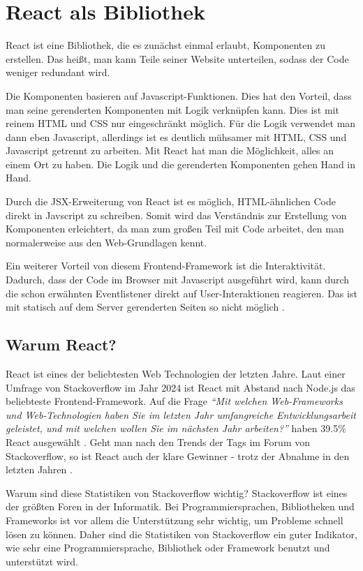 \section{React als Bibliothek}
React ist eine Bibliothek, die es zunächst einmal erlaubt, Komponenten zu erstellen. Das heißt, man kann Teile seiner Website unterteilen, sodass der Code weniger redundant wird. 

Die Komponenten basieren auf Javascript-Funktionen. Dies hat den Vorteil, dass man seine gerenderten Komponenten mit Logik verknüpfen kann. Dies ist mit reinem HTML und CSS nur eingeschränkt möglich. Für die Logik verwendet man dann eben Javascript, allerdings ist es deutlich mühsamer mit HTML, CSS und Javascript getrennt zu arbeiten. Mit React hat man die Möglichkeit, alles an einem Ort zu haben. Die Logik und die gerenderten Komponenten gehen Hand in Hand.

Durch die JSX-Erweiterung von React ist es möglich, HTML-ähnlichen Code direkt in Javscript zu schreiben. Somit wird das Verständnis zur Erstellung von Komponenten erleichtert, da man zum großen Teil mit Code arbeitet, den man normalerweise aus den Web-Grundlagen kennt.

Ein weiterer Vorteil von diesem Frontend-Framework ist die Interaktivität. Dadurch, dass der Code im Browser mit Javascript ausgeführt wird, kann durch die schon erwähnten Eventlistener direkt auf User-Interaktionen reagieren. Das ist mit statisch auf dem Server gerenderten Seiten so nicht möglich \parencite[vgl.][]{meta_react_nodate}.

\subsection{Warum React?}
React ist eines der beliebtesten Web Technologien der letzten Jahre. Laut einer Umfrage von Stackoverflow im Jahr 2024 ist React mit Abstand nach Node.js das beliebteste Frontend-Framework. Auf die Frage \textit{\enquote{Mit welchen Web-Frameworks und Web-Technologien haben Sie im letzten Jahr umfangreiche Entwicklungsarbeit geleistet, und mit welchen wollen Sie im nächsten Jahr arbeiten?}} haben 39.5\% React ausgewählt \parencite[vgl.][]{stackoverflow_survey_2024}. Geht man nach den Trends der Tags im Forum von Stackoverflow, so ist React auch der klare Gewinner - trotz der Abnahme in den letzten Jahren \parencite[vgl.][]{stackoverflow_trends_2024}.

Warum sind diese Statistiken von Stackoverflow wichtig? Stackoverflow ist eines der größten Foren in der Informatik. Bei Programmiersprachen, Bibliotheken und Frameworks ist vor allem die Unterstützung sehr wichtig, um Probleme schnell lösen zu können. Daher sind die Statistiken von Stackoverflow ein guter Indikator, wie sehr eine Programmiersprache, Bibliothek oder Framework benutzt und unterstützt wird.

